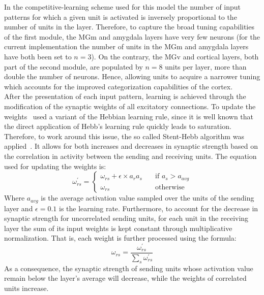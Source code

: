 In the competitive-learning scheme used for this model the number of input patterns for which a given unit is activated is inversely proportional to the number of units in the layer. Therefore, to capture the broad tuning capabilities of the first module, the MGm and amygdala layers have very few neurons (for the current implementation the number of units in the MGm and amygdala layers have both been set to $n = 3$). On the contrary, the MGv and cortical layers, both part of the second module, are populated by $n = 8$ units per layer, more than double the number of neurons. Hence, allowing units to acquire a narrower tuning which accounts for the improved categorization capabilities of the cortex.\\

After the presentation of each input pattern, learning is achieved through the modification of the synaptic weights of all excitatory connections. To update the weights~\citet{Armony1995} used a variant of the Hebbian learning rule, since it is well known that the direct application of Hebb's learning rule quickly leads to saturation. Therefore, to work around this issue, the so called Stent-Hebb algorithm was applied~\supercite{stent_physiological_1973}. It allows for both increases and decreases in synaptic strength based on the correlation in activity between the sending and receiving units. The equation used for updating the weights is:
\begin{equation}\label{equ:hebb1}
   \omega^{\prime}_{rs} = 
   \begin{cases}
      \omega_{rs} + \epsilon \times a_{r} a_{s} & \quad \text{if } a_{s} > a_{avg}\\
      \omega_{rs} & \quad \text{otherwise}
   \end{cases}
\end{equation}
Where $a_{avg}$ is the average activation value sampled over the units of the sending layer and $\epsilon = 0.1$ is the learning rate. Furthermore, to account for the decrease in synaptic strength for uncorrelated sending units, for each unit in the receiving layer the sum of its input weights is kept constant through multiplicative normalization. That is, each weight is further processed using the formula:
\begin{equation}\label{equ:normal}
   \omega_{rs} = \frac{\omega^{\prime}_{rs}}{\sum_{s} \omega^{\prime}_{rs}}
\end{equation}
As a consequence, the synaptic strength of sending units whose activation value remain below the layer's average will decrease, while the weights of correlated units increase.\\

